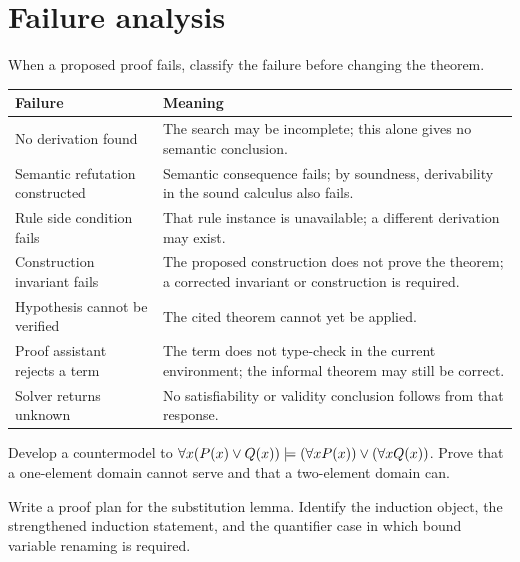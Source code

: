 \section{Failure analysis}
\label{sec:formal-practice-05}

When a proposed proof fails, classify the failure before changing the theorem.
\begin{longtable}{@{}p{}p{}@{}}
\toprule
Failure & Meaning \\
\midrule
\endhead
No derivation found & The search may be incomplete; this alone gives no
semantic conclusion. \\
Semantic refutation constructed & Semantic consequence fails; by soundness,
derivability in the sound calculus also fails. \\
Rule side condition fails & That rule instance is unavailable; a different
derivation may exist. \\
Construction invariant fails & The proposed construction does not prove the
theorem; a corrected invariant or construction is required. \\
Hypothesis cannot be verified & The cited theorem cannot yet be applied. \\
Proof assistant rejects a term & The term does not type-check in the current
environment; the informal theorem may still be correct. \\
Solver returns unknown & No satisfiability or validity conclusion follows from
that response. \\
\bottomrule
\end{longtable}

\begin{exercise}
\label{ex:formal-practice-01}
Develop a countermodel to
\(\forall x(P(x)\lor Q(x))\models
(\forall xP(x))\lor(\forall xQ(x))\).  Prove that a one-element domain cannot
serve and that a two-element domain can.
\end{exercise}

\begin{exercise}
\label{ex:formal-practice-02}
Write a proof plan for the substitution lemma.  Identify the induction object,
the strengthened induction statement, and the quantifier case in which bound
variable renaming is required.
\end{exercise}

